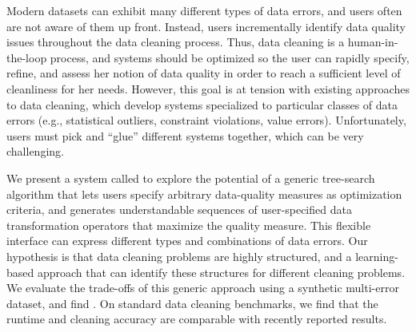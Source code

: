 Modern datasets can exhibit many different types of data errors, and users often are not aware of them up front.  Instead, users incrementally identify data quality issues throughout the data cleaning process. Thus, data cleaning is a human-in-the-loop process, and systems should be optimized so the user can rapidly specify, refine, and assess her notion of data quality in order to reach a sufficient level of cleanliness for her needs.   However, this goal is at tension with existing approaches to data cleaning, which develop systems specialized to particular classes of data errors (e.g., statistical outliers, constraint violations, value errors).  Unfortunately, users must pick and ``glue'' different systems together, which can be very challenging.

We present a system called \sys to explore the potential of a generic tree-search algorithm that lets users specify arbitrary data-quality measures as optimization criteria, and generates understandable sequences of user-specified data transformation operators that maximize the quality measure.  This flexible interface can express different types and combinations of data errors.  Our hypothesis is that data cleaning problems are highly structured, and a learning-based approach that can identify these structures for different cleaning problems.  We evaluate the trade-offs of this generic approach using a synthetic multi-error dataset, and find .  On  standard data cleaning benchmarks, we find that the runtime and cleaning accuracy are comparable with recently reported results.


